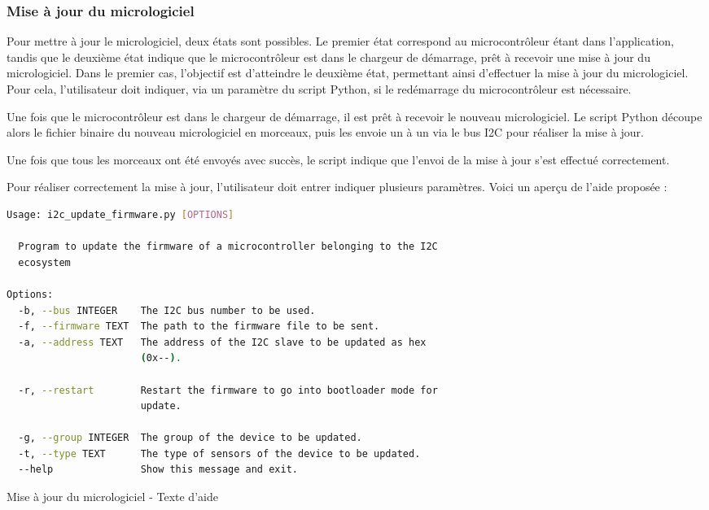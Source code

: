 \subsubsection{Mise à jour du micrologiciel}

Pour mettre à jour le micrologiciel, deux états sont possibles.
Le premier état correspond au microcontrôleur étant dans l'application, tandis que le deuxième état indique que le microcontrôleur est dans le chargeur de démarrage, prêt à recevoir une mise à jour du micrologiciel.
Dans le premier cas, l'objectif est d'atteindre le deuxième état, permettant ainsi d'effectuer la mise à jour du micrologiciel.
Pour cela, l'utilisateur doit indiquer, via un paramètre du script Python, si le redémarrage du microcontrôleur est nécessaire.

Une fois que le microcontrôleur est dans le chargeur de démarrage, il est prêt à recevoir le nouveau micrologiciel.
Le script Python découpe alors le fichier binaire du nouveau micrologiciel en morceaux, puis les envoie un à un via le bus I2C pour réaliser la mise à jour.

Une fois que tous les morceaux ont été envoyés avec succès, le script indique que l'envoi de la mise à jour s'est effectué correctement.

Pour réaliser correctement la mise à jour, l'utilisateur doit entrer indiquer plusieurs paramètres. Voici un aperçu de l'aide proposée :

\begin{listing}[!h]
    \begin{lstlisting}[language=bash]
Usage: i2c_update_firmware.py [OPTIONS]

  Program to update the firmware of a microcontroller belonging to the I2C
  ecosystem

Options:
  -b, --bus INTEGER    The I2C bus number to be used.
  -f, --firmware TEXT  The path to the firmware file to be sent.
  -a, --address TEXT   The address of the I2C slave to be updated as hex
                       (0x--).

  -r, --restart        Restart the firmware to go into bootloader mode for
                       update.

  -g, --group INTEGER  The group of the device to be updated.
  -t, --type TEXT      The type of sensors of the device to be updated.
  --help               Show this message and exit.
    \end{lstlisting}
    \caption{Mise à jour du micrologiciel - Texte d'aide}
\end{listing}

